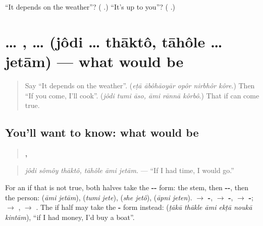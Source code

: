 \begin{tcolorbox}[breakable,colback=teal!4,colframe=teal!35!black,title={Before you move on}]
\textquotedblleft{}It depends on the weather\textquotedblright{}? (\textbf{    }.) \textquotedblleft{}It's up to you\textquotedblright{}? (\textbf{   }.)
\end{tcolorbox}
\section[\texorpdfstring{\bn{যদি} … \bn{থাকত} … (jôdi … thāktô …)}{যদি … থাকত … (jôdi … thāktô …)}]{ … ,  …  (jôdi … thāktô, tāhôle … jetām) — what would be}

\label{lesson:BN-C275-jetam}



\begin{quote}
Say \textquotedblleft{}It depends on the weather\textquotedblright{}. (\emph{eṭā ābôhāoyār opôr nirbhôr kôre}.) Then \textquotedblleft{}If you come, I'll cook\textquotedblright{}. (\emph{jôdi tumi āso, āmi rānnā kôrbô}.) That if can come true.
\end{quote}

\subsection*{You'll want to know: what would be}
\begin{quote}
\textbf{  ,   }
\end{quote}

\begin{quote}
\emph{jôdi sômôy thāktô, tāhôle āmi jetām.} — \textquotedblleft{}If I had time, I would go.\textquotedblright{}
\end{quote}

For an if that is not true, both halves take the \textbf{--} form: the stem, then \textbf{--}, then the person: \textbf{ } (\emph{āmi jetām}), \textbf{ } (\emph{tumi jete}), \textbf{ } (\emph{she jetô}), \textbf{ } (\emph{āpni jeten}). \textbf{} $\to$ \textbf{-}, \textbf{} $\to$ \textbf{-}, \textbf{} $\to$ \textbf{-}; \textbf{} $\to$ \textbf{}, \textbf{} $\to$ \textbf{}. The if half may take the \textbf{-} form instead: \textbf{     } (\emph{ṭākā thākle āmi ekṭā noukā kintām}), \textquotedblleft{}if I had money, I'd buy a boat\textquotedblright{}.

